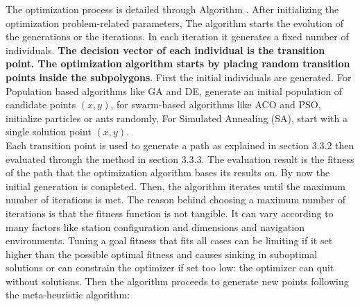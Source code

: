 The optimization process is detailed through Algorithm . After initializing the optimization problem-related
parameters, The algorithm starts the evolution of the generations or the iterations. In each iteration it generates a fixed 
number of individuals. \textbf{The decision vector of each individual is the transition point. The optimization algorithm
starts by placing random transition points inside the subpolygons}. First the initial individuals are generated. 
For Population based algorithms like GA and DE, generate an initial population of candidate points $(x, y)$, for swarm-based algorithms
like ACO and PSO, 
initialize particles or ants randomly, For Simulated Annealing (SA), start with a single solution point $(x, y)$.\\
Each transition point is used to generate a path as explained
in section 3.3.2 then evaluated through the method in section 3.3.3. The evaluation result is the fitness of the path that the 
optimization algorithm bases its results on. By now the initial generation is completed. Then, the algorithm iterates until 
the maximum number of iterations is met. The reason behind choosing a maximum number of iterations is that the fitness function 
is not tangible. It can vary according to many factors like station configuration and dimensions and navigation environments.
Tuning a goal fitness that fits all cases can be limiting if it set higher than the possible optimal fitness and causes sinking in 
suboptimal solutions or can constrain the optimizer if set too low: the optimizer can quit without solutions.
Then the algorithm proceeds to generate new points following the meta-heuristic algorithm:

